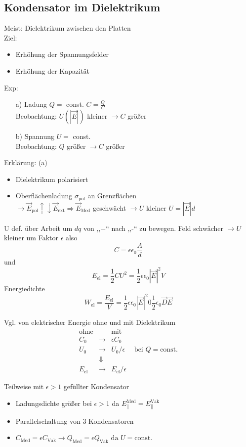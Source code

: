 \documentclass[titlepage,12pt,a4paper,ngerman]{report}
\newcommand{\tx}[1]{\textrm{#1}}
\begin{document}
\subsection{Kondensator im Dielektrikum}
Meist: Dielektrikum zwischen den Platten \\
Ziel: \begin{itemize}
\item Erhöhung der Spannungsfelder
\item Erhöhung der Kapazität
\end{itemize}
Exp: \begin{itemize}
\item[a)] Ladung $Q =$ const. $C = \frac{Q}{C}$\\
Beobachtung: $U(|\vec{E}|) $ kleiner $\rightarrow C$ größer
\item[b)] Spannung $U = $ const. \\
Beobachtung: $Q$ größer $\rightarrow C$ größer
\end{itemize}
Erklärung: (a)
\begin{itemize}
\item Dielektrikum polarisiert
\item Oberflächenladung $\sigma_{\tx{pol}}$ an Grenzflächen\\
$\rightarrow \vec{E}_{\tx{pol}} \uparrow \downarrow \vec{E}_{\tx{ext}} \Rightarrow \vec{E}_{\tx{Med}} $ geschwächt $\rightarrow U$ kleiner $ U = |\vec{E}|d$
\end{itemize}
U def. über Arbeit um $dq$ von ,,+`` nach ,,-`` zu bewegen. Feld schwächer $\rightarrow U$ kleiner um Faktor $\epsilon$ also
$$ C = \epsilon \epsilon_0 \frac{A}{d}$$
und $$E_{\tx{el}} = \frac{1}{2} C U^2 = \frac{1}{2} \epsilon \epsilon_0 |\vec{E}|^2 V$$
Energiedichte $$W_{\tx{el}} = \frac{E_{\tx{el}}}{V} = \frac{1}{2} \epsilon\epsilon_0 | \vec{E} | ^2 0 \frac{1}{2} \epsilon_0 \vec{D} \vec{E}$$


Vgl. von elektrischer Energie ohne und mit Dielektrikum
$$\begin{array}{cccc}
\tx{ohne}&&\tx{mit} \\
C_0 & \rightarrow & \epsilon C_0 \\
U_0 & \rightarrow & U_0/ \epsilon & \tx{ bei } Q = \tx{const.} \\
& \Downarrow\\
E_{\tx{el}} &\rightarrow & E_{\tx{el}} / \epsilon
\end{array}$$

Teilweise mit $\epsilon > 1$ gefüllter Kondensator
\begin{itemize}
\item Ladungsdichte größer bei $ \epsilon >1 $ da $E_{\parallel}^{\tx{Med}} = E_{\parallel}^{\tx{Vak}}$
\item Parallelschaltung von 3 Kondensatoren
\item $ C_{\tx{Med}} = \epsilon C_{\tx{Vak}} \rightarrow Q_{\tx{Med}} = \epsilon Q_{\tx{Vak}} \tx{ da } U = \tx{const.}$
\end{itemize}
\end{document}

